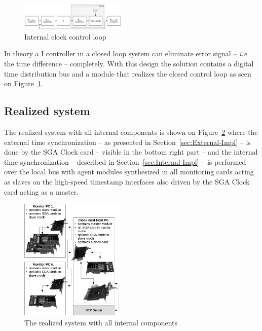 \documentclass[journal]{IEEEtran}
\begin{document}
\begin{figure}[H]
    \centering
    \includegraphics[width=0.45\textwidth]{figures_raw/time_control_loop.png}
    \caption{Internal clock control loop}
    \label{fig:closed-loop}
\end{figure}

In theory a I controller in a closed loop system can eliminate error signal -- \emph{i.e.} the time difference --
completely.
With this design the solution contains a digital time distribution bus and a module that realizes the
closed control loop as seen on Figure~\ref{fig:closed-loop}.

\subsection{Realized system}

The realized system with all internal components is shown on Figure~\ref{fig:realized-system} where the external time
synchronization -- as presented in Section~\ref{sec:External-Impl} -- is done by the SGA Clock card -- visible in the
bottom right part -- and the internal time synchronization -- described in Section~\ref{sec:Internal-Impl} --
is performed over the local bus with agent modules synthesized in all monitoring cards acting as slaves on the
high-speed timestamp interfaces also driven by the SGA Clock card acting as a master.

\begin{figure}[H]
    \centering
    \includegraphics[width=0.45\textwidth]{figures_raw/clock_architecture.png}
    \caption{The realized system with all internal components}
    \label{fig:realized-system}
\end{figure}
\end{document}
